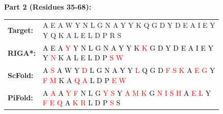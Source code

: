 \documentclass{article}
\theoremstyle{plain}
\theoremstyle{definition}
\theoremstyle{remark}
\begin{document}
{\begin{figure}[t]
\begin{minipage}{0.67\textwidth}
        \vspace{0.2cm} %
        
        \textbf{Part 2 (Residues 35-68):} \\
        \begin{tabular}{ll}
            \textbf{Target:} & \textcolor{green!60!black}{A E A W Y N L G N A Y Y K Q G D Y D E A I E Y Y Q K A L E L D P R S} \\
            \textbf{RIGA*:}   & \textcolor{black}{A} \textcolor{black}{E} \textcolor{black}{A} \textcolor{red}{Y} \textcolor{black}{Y} \textcolor{black}{N} \textcolor{black}{L} \textcolor{black}{G} \textcolor{black}{N} \textcolor{black}{A} \textcolor{black}{Y} \textcolor{black}{Y} \textcolor{black}{K} \textcolor{red}{K} \textcolor{black}{G} \textcolor{black}{D} \textcolor{black}{Y} \textcolor{black}{D} \textcolor{black}{E} \textcolor{black}{A} \textcolor{black}{I} \textcolor{black}{E} \textcolor{black}{Y} \textcolor{black}{Y} \textcolor{red}{N} \textcolor{black}{K} \textcolor{black}{A} \textcolor{black}{L} \textcolor{black}{E} \textcolor{black}{L} \textcolor{black}{D} \textcolor{black}{P} \textcolor{red}{S} \textcolor{red}{W}  \\
            \textbf{ScFold:} & \textcolor{black}{A} \textcolor{red}{S} \textcolor{black}{A} \textcolor{black}{W} \textcolor{black}{Y} \textcolor{red}{D} \textcolor{black}{L} \textcolor{black}{G} \textcolor{black}{N} \textcolor{black}{A} \textcolor{black}{Y} \textcolor{black}{Y} \textcolor{red}{L} \textcolor{black}{Q} \textcolor{black}{G} \textcolor{black}{D} \textcolor{red}{F} \textcolor{red}{S} \textcolor{red}{K} \textcolor{black}{A} \textcolor{red}{E} \textcolor{red}{G} \textcolor{black}{Y} \textcolor{red}{F} \textcolor{red}{M} \textcolor{black}{K} \textcolor{black}{A} \textcolor{red}{Q} \textcolor{red}{A} \textcolor{black}{L} \textcolor{black}{D} \textcolor{black}{P} \textcolor{red}{E} \textcolor{red}{W}  \\
            \textbf{PiFold:} & \textcolor{black}{A} \textcolor{red}{A} \textcolor{black}{A} \textcolor{red}{Y} \textcolor{red}{F} \textcolor{black}{N} \textcolor{black}{L} \textcolor{black}{G} \textcolor{red}{Y} \textcolor{red}{S} \textcolor{black}{Y} \textcolor{red}{A} \textcolor{red}{M} \textcolor{red}{K} \textcolor{black}{G} \textcolor{red}{N} \textcolor{red}{I} \textcolor{red}{S} \textcolor{red}{H} \textcolor{black}{A} \textcolor{red}{E} \textcolor{red}{L} \textcolor{black}{Y} \textcolor{red}{F} \textcolor{red}{E} \textcolor{red}{Q} \textcolor{black}{A} \textcolor{red}{K} \textcolor{red}{R} \textcolor{black}{L} \textcolor{black}{D} \textcolor{black}{P} \textcolor{red}{S} \textcolor{black}{S}  \\
        \end{tabular}
    \end{minipage}


\end{figure}}
\end{document}
